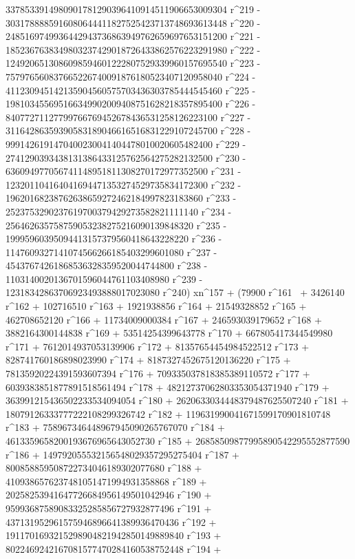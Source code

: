       3378533914980901781290396410914511906653009304 r^219 - 
       3031788885916080644411827525423713748693613448 r^220 - 
       2485169749936442943736863949762659697653151200 r^221 - 
       1852367638349803237429018726433862576223291980 r^222 - 
       1249206513086098594601222807529339960157695540 r^223 - 
       757976560837665226740091876180523407120958040 r^224 - 
       411230945142135904560575703436303785444545460 r^225 - 
       198103455695166349902009408751628218357895400 r^226 - 
       84077271127799766769452678436531258126223100 r^227 - 
       31164286359390583189046616516831229107245700 r^228 - 
       9991426191470400230041404478010020605482400 r^229 - 
       2741290393438131386433125762564275282132500 r^230 - 
       636094977056741148951811308270172977352500 r^231 - 
       123201104164041694471353274529735834172300 r^232 - 
       19620168238762638659272462184997823183860 r^233 - 
       2523753290237619700379429273582821111140 r^234 - 
       256462635758759053238275216090139848320 r^235 - 
       19995960395094413157379560418643228220 r^236 - 
       1147609327141074566266185403299601080 r^237 - 
       45437674261868536328359520044744800 r^238 - 
       1103140020136701596044761103408980 r^239 - 
       12318342863706923493888017023080 r^240) xn^157 + (79900 r^161 \
+ 3426140 r^162 + 102716510 r^163 + 1921938856 r^164 + 
       21549328852 r^165 + 462708652120 r^166 + 
       11734009000384 r^167 + 246593039179652 r^168 + 
       3882164300144838 r^169 + 53514254399643778 r^170 + 
       667805417344549980 r^171 + 7612014937053139906 r^172 + 
       81357654454984522512 r^173 + 828741760186898023990 r^174 + 
       8187327452675120136220 r^175 + 78135920224391593607394 r^176 + 
       709335037818385389110572 r^177 + 
       6039383851877891518561494 r^178 + 
       48212737062803353054371940 r^179 + 
       363991215436502233534094054 r^180 + 
       2620633034448379487625507240 r^181 + 
       18079126333777222108299326742 r^182 + 
       119631990041671599170901810748 r^183 + 
       758967346448967945090265767070 r^184 + 
       4613359658200193676965643052730 r^185 + 
       26858509877995890542295552877590 r^186 + 
       149792055532156548029357295275404 r^187 + 
       800858859508722734046189302077680 r^188 + 
       4109386576237481051471994931358868 r^189 + 
       20258253941647726684956149501042946 r^190 + 
       95993687589083325285856727932877496 r^191 + 
       437131952961575946896641389936470436 r^192 + 
       1911701693215298904821942850149889840 r^193 + 
       8022469242167081577470284160538752448 r^194 + 
